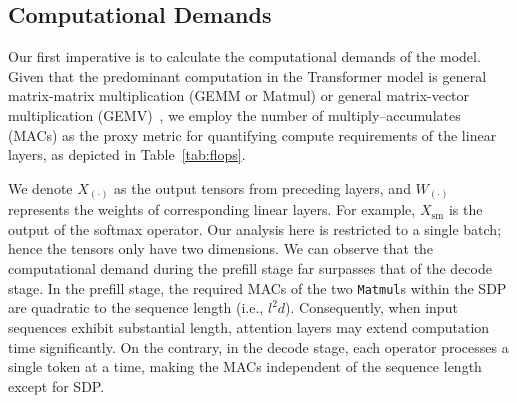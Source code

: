 \subsection{Computational Demands}
\label{sub:mac_analysis}
Our first imperative is to calculate the computational demands of the model.
Given that the predominant computation in the Transformer model is general matrix-matrix multiplication (GEMM or Matmul) or general matrix-vector multiplication (GEMV)~\cite{pope2022googleinf,kim2023survey}, we employ the number of multiply–accumulates (MACs) as the proxy metric for quantifying compute requirements of the linear layers, as depicted in Table~\ref{tab:flops}.

We denote $X_{(\cdot)}$ as the output tensors from preceding layers, and $W_{(\cdot)}$ represents the weights of corresponding linear layers.
For example, $X_{\text{sm}}$ is the output of the softmax operator.
Our analysis here is restricted to a single batch; hence the tensors only have two dimensions.
We can observe that the computational demand during the prefill stage far surpasses that of the decode stage.
In the prefill stage, the required MACs of the two \texttt{Matmul}s within the SDP are quadratic to the sequence length (i.e., $l^2d$).
Consequently, when input sequences exhibit substantial length, attention layers may extend computation time significantly.
On the contrary, in the decode stage, each operator processes a single token at a time, making the MACs independent of the sequence length except for SDP.

